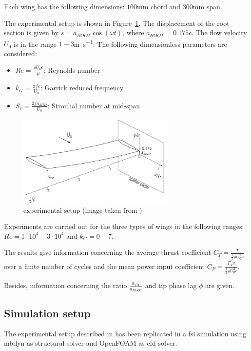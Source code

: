 Each wing has the following dimensions: $100$\si{mm} chord and $300$\si{mm} span.

The experimental setup is shown in Figure~\ref{fig:0012exp}. The displacement of the root section is given by $s = a_{ROOT} \cos(\omega t)$, where $a_{ROOT} = 0.175c$. The flow velocity $U_0$ is in the range $1-3$\si{m.s^{-1}}. The following dimensionless parameters are considered:

\begin{itemize}
	\item $Re = \frac{\rho U_0 c}{\mu}$: Reynolds number
	\item $k_G = \frac{\pi f c}{U_0}$: Garrick reduced frequency
	\item $S_r = \frac{2f a_{MID}}{U_0}$: Strouhal number at mid-span
\end{itemize}

\begin{figure}[htbp!]
	\centering
	\includegraphics[width=0.7\textwidth]{images/naca0012_exp}
	\caption{experimental setup (image taken from \cite{heathcote2008effect})}
	\label{fig:0012exp}
\end{figure}

Experiments are carried out for the three types of wings in the following ranges: $Re=1\cdot10^4-3\cdot10^4$ and $k_G=0-7$.

The results give information concerning the average thrust coefficient $C_T = \frac{T}{\frac{1}{2}\rho U_0^2c}$ over a finite number of cycles and the mean power input coefficient $\bar{C}_P = \frac{\bar{F_y v}}{\frac{1}{2}\rho U_0^3c}$.

Besides, information concerning the ratio $\frac{a_{TIP}}{a_{ROOT}}$ and tip phase lag $\phi$ are given.

\subsection{Simulation setup}

The experimental setup described in \cite{heathcote2008effect} has been replicated in a \acrshort{fsi} simulation using \acrshort{mbdyn} as structural solver and OpenFOAM as \acrshort{cfd} solver.

